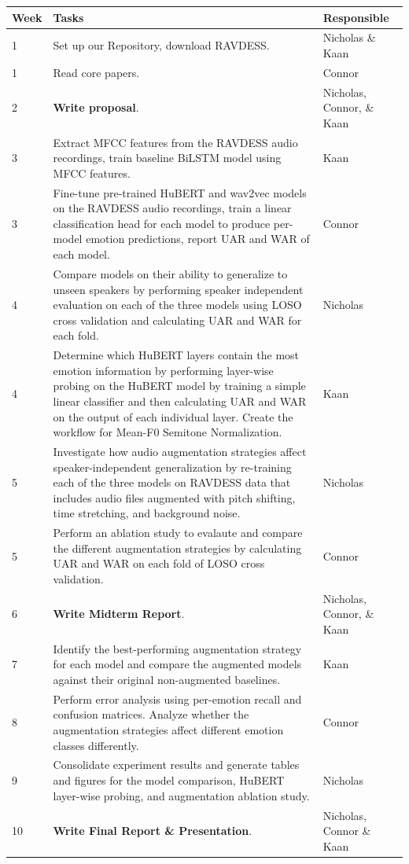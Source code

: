 \documentclass[11pt, letterpaper]{article}
\begin{document}
\begin{center}
\begin{longtable}{l>{\raggedright\arraybackslash}p{7cm}l}
\toprule
\textbf{Week} & \textbf{Tasks} & \textbf{Responsible} \\
\midrule
1 & Set up our Repository, download RAVDESS.  & Nicholas \& Kaan \\
1 & Read core papers. & Connor \\
2 & \textbf{Write proposal}. & Nicholas, Connor, \& Kaan \\
3 & Extract MFCC features from the RAVDESS audio recordings, train baseline BiLSTM model using MFCC features.  & Kaan \\
3 & Fine-tune pre-trained HuBERT and wav2vec models on the RAVDESS audio recordings, train a linear classification head for each model to produce per-model emotion predictions, report UAR and WAR of each model. & Connor \\
4 & Compare models on their ability to generalize to unseen speakers by performing speaker independent evaluation on each of the three models using LOSO cross validation and calculating UAR and WAR for each fold. & Nicholas \\
4 & Determine which HuBERT layers contain the most emotion information by performing layer-wise probing on the HuBERT model by training a simple linear classifier and then calculating UAR and WAR on the output of each individual layer. Create the workflow for Mean-F0 Semitone Normalization.& Kaan \\
5 & Investigate how audio augmentation strategies affect speaker-independent generalization by re-training each of the three models on RAVDESS data that includes audio files augmented with pitch shifting, time stretching, and background noise. & Nicholas \\
5 & Perform an ablation study to evalaute and compare the different augmentation strategies by calculating UAR and WAR on each fold of LOSO cross validation. & Connor \\
6 & \textbf{Write Midterm Report}. & Nicholas, Connor, \& Kaan \\
7 & Identify the best-performing augmentation strategy for each model and compare the augmented models against their original non-augmented baselines. & Kaan \\
8 & Perform error analysis using per-emotion recall and confusion matrices. Analyze whether the augmentation strategies affect different emotion classes differently. & Connor \\
9 & Consolidate experiment results and generate tables and figures for the model comparison, HuBERT layer-wise probing, and augmentation ablation study. & Nicholas \\
10 & \textbf{Write Final Report \& Presentation}. & Nicholas, Connor \& Kaan \\
\bottomrule
\end{longtable}
\end{center}
\end{document}
